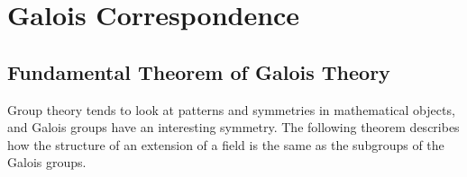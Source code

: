 \documentclass[12pt]{article}
\newtheorem{theorem}{Theorem}
\theoremstyle{definition}
\newcommand{\Fix}{\operatorname{Fix}}
\begin{document}

    

\section{Galois Correspondence}
\subsection{Fundamental Theorem of Galois Theory}

Group theory tends to look at patterns and symmetries in mathematical objects, and Galois groups have an interesting symmetry. The following theorem describes how the structure of an extension of a field is the same as the subgroups of the Galois groups.
\end{document}
